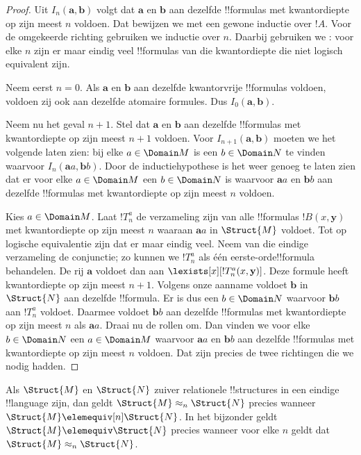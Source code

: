 \documentclass[../../../include/open-logic-section]{subfiles}
\begin{document}
\begin{proof}
  Uit $I_n(\mathbf{a},\mathbf{b})$ volgt dat $\mathbf{a}$ en
  $\mathbf{b}$ aan dezelfde !!{formula}s met kwantordiepte op zijn
  meest $n$ voldoen. Dat bewijzen we met een gewone inductie over $!A$.
  Voor de omgekeerde richting gebruiken we inductie over $n$. Daarbij
  gebruiken we : voor elke $n$ zijn er maar
  eindig veel !!{formula}s van die kwantordiepte die niet logisch
  equivalent zijn.

  Neem eerst $n=0$. Als $\mathbf{a}$ en $\mathbf{b}$ aan dezelfde
  kwantorvrije !!{formula}s voldoen, voldoen zij ook aan dezelfde
  atomaire formules. Dus $I_0(\mathbf{a},\mathbf{b})$.

  Neem nu het geval $n+1$. Stel dat $\mathbf{a}$ en $\mathbf{b}$ aan
  dezelfde !!{formula}s met kwantordiepte op zijn meest $n+1$ voldoen.
  Voor $I_{n+1}(\mathbf{a},\mathbf{b})$ moeten we het volgende laten
  zien: bij elke $a \in \Domain M$ is een $b \in \Domain N$ te vinden
  waarvoor $I_n(\mathbf{a}a,\mathbf{b}b)$. Door de inductiehypothese is
  het weer genoeg te laten zien dat er voor elke $a \in \Domain M$ een
  $b \in \Domain N$ is waarvoor $\mathbf{a}a$ en $\mathbf{b}b$ aan
  dezelfde !!{formula}s met kwantordiepte op zijn meest $n$ voldoen.

  Kies $a \in \Domain M$. Laat $!T^a_n$ de verzameling zijn van alle
  !!{formula}s $!B(x,\mathbf{y})$ met kwantordiepte op zijn meest $n$
  waaraan $\mathbf{a}a$ in $\Struct{M}$ voldoet. Tot op logische
  equivalentie zijn dat er maar eindig veel. Neem van die eindige
  verzameling de conjunctie; zo kunnen we $!T^a_n$ als één
  eerste-orde!!{formula} behandelen. De rij $\mathbf{a}$ voldoet dan
  aan $\lexists[x][!T^a_n(x,\mathbf{y})]$. Deze formule heeft
  kwantordiepte op zijn meest $n+1$. Volgens onze aanname voldoet
  $\mathbf{b}$ in $\Struct{N}$ aan dezelfde !!{formula}. Er is dus een
  $b \in \Domain N$ waarvoor $\mathbf{b}b$ aan $!T^a_n$ voldoet.
  Daarmee voldoet $\mathbf{b}b$ aan dezelfde !!{formula}s met
  kwantordiepte op zijn meest $n$ als $\mathbf{a}a$.
  Draai nu de rollen om. Dan vinden we voor elke $b \in \Domain N$ een
  $a\in \Domain M$ waarvoor $\mathbf{a}a$ en $\mathbf{b}b$ aan
  dezelfde !!{formula}s met kwantordiepte op zijn meest $n$ voldoen.
  Dat zijn precies de twee richtingen die we nodig hadden.
\end{proof}

\begin{cor}
  Als $\Struct{M}$ en $\Struct{N}$ zuiver relationele !!{structure}s
  in een eindige !!{language} zijn, dan geldt
  $\Struct{M} \approx_n\Struct{N}$ precies wanneer
  $\Struct{M} \elemequiv[n] \Struct{N}$. In het bijzonder geldt
  $\Struct{M} \elemequiv \Struct{N}$ precies wanneer voor elke $n$
  geldt dat $\Struct{M} \approx_n \Struct{N}$.
\end{cor}
\end{document}
